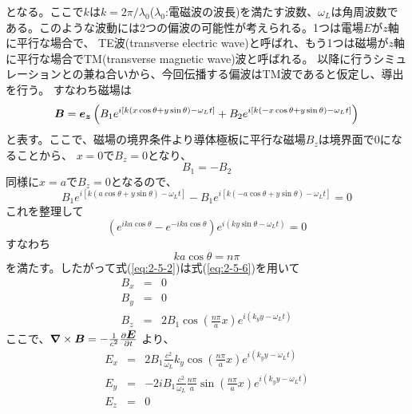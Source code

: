 \documentclass[a4paper,11pt,titlepage]{jarticle}
\newcommand{\bm}[1]{{\mbox{\boldmath $#1$}}}
\numberwithin{equation}{section} %
\begin{document}
  となる。ここで$k$は$k=2\pi/\lambda_0$($\lambda_0$:電磁波の波長)を満たす波数、$\omega_L$は角周波数である。このような波動には2つの偏波の可能性が考えられる。1つは電場$E$が$z$軸に平行な場合で、
  TE波(transverse electric wave)と呼ばれ、もう1つは磁場が$z$軸に平行な場合でTM(transverse magnetic wave)波と呼ばれる。
  以降に行うシミュレーションとの兼ね合いから、今回伝播する偏波はTM波であると仮定し、導出を行う。
  すなわち磁場は
  \begin{equation}
    \label{eq:2-5-2}
    \bm{B} = \bm{e_z} \left( B_1 e^{i[k(x \cos \theta + y \sin \theta ) - \omega_L t ] }
                  + B_2 e^{i[k(-x \cos \theta + y \sin \theta ) - \omega_L t ] }    \right)    
  \end{equation}
  と表す。ここで、磁場の境界条件より導体極板に平行な磁場$B_z$は境界面で0になることから、
  $x=0$で$B_z=0$となり、
  \begin{equation}
    \label{eq:2-5-3}
    B_1 = - B_2
  \end{equation}
  同様に$x=a$で$B_z=0$となるので、
  \begin{equation}
    \label{eq:2-5-4}
            B_1 e^{i[k(a \cos \theta + y \sin \theta ) - \omega_L t ] }
          - B_1 e^{i[k(-a \cos \theta + y \sin \theta ) - \omega_L t ] }    
          = 0 
  \end{equation}
  これを整理して
  \begin{equation}
    \label{eq:2-5-5}
    \left(  e^{ ika \cos \theta } - e^{ -ika \cos \theta } \right) e^{ i \left( ky \sin \theta - \omega_L t  \right) } 
          = 0 
  \end{equation}
  すなわち
  \begin{equation}
    \label{eq:2-5-6}
    ka \cos \theta = n \pi 
  \end{equation} 
  を満たす。したがって式(\ref{eq:2-5-2})は式(\ref{eq:2-5-6})を用いて
  \begin{eqnarray}
    \label{eq:2-5-7}
    B_x &=& 0  \\
    \label{eq:2-5-8}
    B_y &=& 0 \\
    \label{eq:2-5-9}
    B_z &=&  2 B_1 \cos ( \frac{n \pi}{a} x ) e^{ i \left( k_y y - \omega_L t  \right) }
  \end{eqnarray}
  ここで、$ \bm{\nabla} \times \bm{B} = - \frac{1}{c^2} \frac{\partial \bm{E} }{ \partial t } $ より、
  \begin{eqnarray}
    \label{eq:2-5-10}
    E_x &=& 2 B_1 \frac{c^2}{\omega_L} k_y \cos( \frac{n\pi}{a} x ) e^{ i \left( k_y y  - \omega_L t  \right) }  \\
    \label{eq:2-5-11}
    E_y &=& -2 i B_1  \frac{c^2}{\omega_L} \frac{n\pi}{a} \sin ( \frac{n \pi}{a} x ) e^{ i \left( k_y y - \omega_L t  \right) } \\
    \label{eq:2-5-12}
    E_z &=& 0
  \end{eqnarray}
\end{document}
